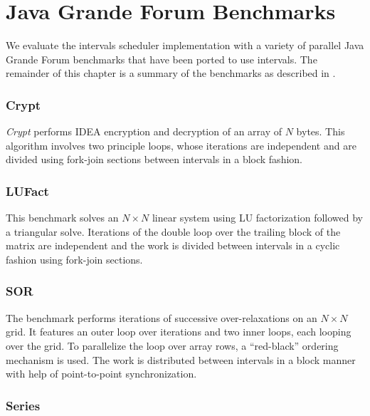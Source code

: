 
\chapter{Java Grande Forum Benchmarks}
\label{chap:benchmarks}

We evaluate the intervals scheduler implementation with a variety of
parallel Java Grande Forum benchmarks \cite{Smith2001, Mathew1999,
  Daly2003} that have been ported to use intervals. The remainder of
this chapter is a summary of the benchmarks as described in
\cite{Smith2001}.

\subsection*{Crypt}

\emph{Crypt} performs IDEA encryption and decryption of an array of
$N$ bytes. This algorithm involves two principle loops, whose
iterations are independent and are divided using fork-join sections
between intervals in a block fashion.

\subsection*{LUFact}

This benchmark solves an $N \times N$ linear system using LU
factorization followed by a triangular solve. Iterations of the double
loop over the trailing block of the matrix are independent and the
work is divided between intervals in a cyclic fashion using fork-join
sections.

\subsection*{SOR}

The benchmark performs iterations of successive over-relaxations on an
$N \times N$ grid. It features an outer loop over iterations and two
inner loops, each looping over the grid. To parallelize the loop over
array rows, a ``red-black'' ordering mechanism is used. The work is
distributed between intervals in a block manner with help of
point-to-point synchronization.

\subsection*{Series}

